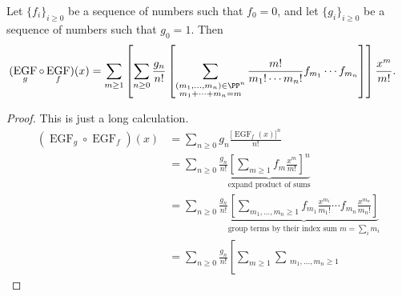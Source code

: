 \documentclass{article}
\DeclareMathOperator{\EGF}{EGF}
\begin{document}
\begin{theorem}
    Let $\{f_i\}_{i\geq0}$ be a sequence of numbers such that $f_0 = 0$, and let $\{g_i\}_{i\geq0}$ be a sequence of numbers such that $g_0 = 1$.
    Then
    \begin{align*}
        (\EGF_g \circ \EGF_f)(x)
        &=
        \sum_{m\geq1}
        \left[
            \sum_{n\geq0}
            \frac{g_n}{n!}
            \left[
                    \sum_{\substack{(m_1,\ldots,m_n)\in\PP^n\\m_1+\cdots+m_n=m}}
                    \frac{m!}{m_1!\cdots m_n!}f_{m_1}\cdots f_{m_n}
            \right]
        \right]
        \frac{x^m}{m!}.
    \end{align*}
\end{theorem}

\begin{proof}
    This is just a long calculation.
    \begin{align*}
        (\EGF_g \circ \EGF_f)(x) &= 
        \sum_{n\geq0}
        g_n \frac{\big[\EGF_f(x)\big]^n}{n!} \\
                                 &= 
                                 \sum_{n\geq0} 
                                 \frac{g_n}{n!}
                                 \underbrace{
                                     \left[
                                         \sum_{m\geq1}f_m\frac{x^m}{m!}
                                     \right]^n
                                 }_{\text{expand product of sums}} \\
                                 &= 
                                 \sum_{n\geq0}
                                 \frac{g_n}{n!}
                                 \underbrace{
                                     \left[
                                         \sum_{m_1,\ldots,m_n\geq1}
                                         f_{m_1}\frac{x^{m_1}}{m_1!} \cdots f_{m_n}\frac{x^{m_n}}{m_n!}
                                     \right]
                                 }_{\text{group terms by their index sum }m =\sum_i{m_i}} \\
                                 &= 
                                 \sum_{n\geq0}
                                 \frac{g_n}{n!}
                                 \left[
                                     \sum_{m\geq1}
                                     \sum_{
                                         \substack{
                                             m_1,\ldots,m_n\geq1 \\
}}
\end{align*}
\end{proof}
\end{document}

